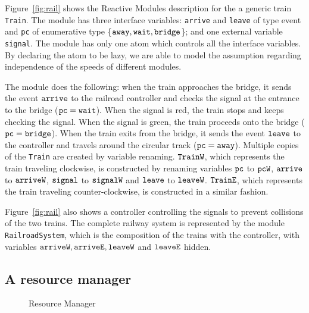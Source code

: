 {\mypar
Figure~\ref{fig:rail} shows the Reactive Modules description for the a
generic train {\tt Train}. The module has three interface variables:
{\tt arrive} and {\tt leave} of type event and
{\tt pc} of enumerative type \{$\mbox{\tt away}, \mbox{\tt wait}, \mbox{\tt bridge}$\};
and one external variable {\tt signal}.
The module has only one atom which controls all the
interface variables. By declaring the atom to be lazy, we are able to
model the assumption regarding independence of the speeds of different
modules.


\mypar
The module does the following: when the train approaches the bridge,
it sends the event $\mbox{\tt arrive}$ to the railroad controller and checks the
signal at the entrance to the bridge ($\mbox{\tt pc}=\mbox{\tt wait}$).  When the signal
is red, the train stops and keeps checking the signal. When the
signal is green, the train proceeds onto the bridge ($\mbox{\tt pc}=\mbox{\tt bridge}$).
When the train exits from the bridge, it sends the event $\mbox{\tt leave}$ to
the controller and travels around the circular track ($\mbox{\tt pc}=\mbox{\tt away}$).
Multiple copies of the {\tt Train} are created by variable renaming.
$\mbox{\tt TrainW}$, which represents the train traveling clockwise, is
constructed by renaming variables $\mbox{\tt pc}$ to $\mbox{\tt pcW}$, $\mbox{\tt arrive}$ to
$\mbox{\tt arriveW}$, $\mbox{\tt signal}$ to $\mbox{\tt signalW}$ and $\mbox{\tt leave}$ to $\mbox{\tt leaveW}$.
$\mbox{\tt TrainE}$, which represents the train traveling
counter-clockwise, is constructed in a similar fashion.

\mypar
Figure~\ref{fig:rail} also shows a controller controlling the signals to
prevent collisions of the two trains. The complete railway system is represented by the module {\tt RailroadSystem},
which is the composition of the trains with the controller, with
variables $\mbox{\tt arriveW}, \mbox{\tt arriveE}, \mbox{\tt leaveW}$ and $\mbox{\tt leaveE}$ hidden.

\subsection{A resource manager}

\begin{figure}
\label{fig:rmanager}
\begin{center}
\resizebox{!}{35ex}{}
\caption{Resource Manager}
\end{center}
\end{figure}

}
